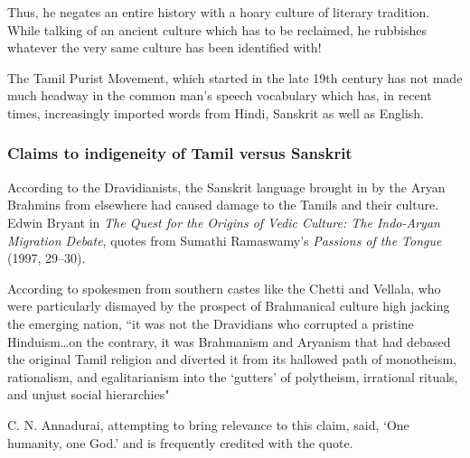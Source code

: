 Thus, he negates an entire history with a hoary culture of literary tradition. While talking of an ancient culture which has to be reclaimed, he rubbishes whatever the very same culture has been identified with!

The Tamil Purist Movement, which started in the late 19th century has not made much headway in the common man’s speech vocabulary which has, in recent times, increasingly imported words from Hindi, Sanskrit as well as English.


\subsubsection*{Claims to indigeneity of Tamil versus Sanskrit}

\vskip -8pt

According to the Dravidianists, the Sanskrit language brought in by the Aryan Brahmins from elsewhere had caused damage to the Tamils and their culture. Edwin Bryant in \textit{The Quest for the Origins of Vedic Culture: The Indo-Aryan Migration Debate}, quotes from Sumathi Ramaswamy’s \textit{Passions of the Tongue} (1997, 29–30).

\begin{myquote}
According to spokesmen from southern castes like the Chetti and Vellala, who were particularly dismayed by the prospect of Brahmanical culture high jacking the emerging nation, “it was not the Dravidians who corrupted a pristine Hinduism…on the contrary, it was Brahmanism and Aryanism that had debased the original Tamil religion and diverted it from its hallowed path of monotheism, rationalism, and egalitarianism into the ‘gutters’ of polytheism, irrational rituals, and unjust social hierarchies"
\end{myquote}

C. N. Annadurai, attempting to bring relevance to this claim, said, ‘One humanity, one God.’ and is frequently credited with the quote.

